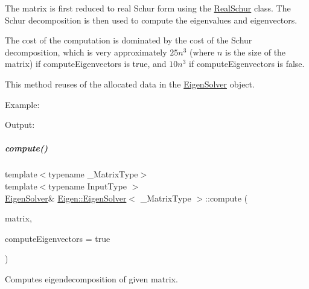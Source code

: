 The matrix is first reduced to real Schur form using the \hyperlink{group___eigenvalues___module_class_eigen_1_1_real_schur}{Real\+Schur} class. The Schur decomposition is then used to compute the eigenvalues and eigenvectors.

The cost of the computation is dominated by the cost of the Schur decomposition, which is very approximately $ 25n^3 $ (where $ n $ is the size of the matrix) if {\ttfamily compute\+Eigenvectors} is true, and $ 10n^3 $ if {\ttfamily compute\+Eigenvectors} is false.

This method reuses of the allocated data in the \hyperlink{group___eigenvalues___module_class_eigen_1_1_eigen_solver}{Eigen\+Solver} object.

Example\+: 
\begin{DoxyCodeInclude}
\end{DoxyCodeInclude}
 Output\+: 
\begin{DoxyVerbInclude}
\end{DoxyVerbInclude}
 \mbox{\label{group___eigenvalues___module_a38d032b75b3e75640e3db42e7ab20c24}} 
\subparagraph{\texorpdfstring{compute()}{compute()}\hspace{0.1cm}{\footnotesize\ttfamily [2/2]}}
{\footnotesize\ttfamily template$<$typename \+\_\+\+Matrix\+Type$>$ \\
template$<$typename Input\+Type $>$ \\
\hyperlink{group___eigenvalues___module_class_eigen_1_1_eigen_solver}{Eigen\+Solver}\& \hyperlink{group___eigenvalues___module_class_eigen_1_1_eigen_solver}{Eigen\+::\+Eigen\+Solver}$<$ \+\_\+\+Matrix\+Type $>$\+::compute (\begin{DoxyParamCaption}\item[{const \hyperlink{group___core___module_struct_eigen_1_1_eigen_base}{Eigen\+Base}$<$ Input\+Type $>$ \&}]{matrix,  }\item[{bool}]{compute\+Eigenvectors = {\ttfamily true} }\end{DoxyParamCaption})}



Computes eigendecomposition of given matrix. 


